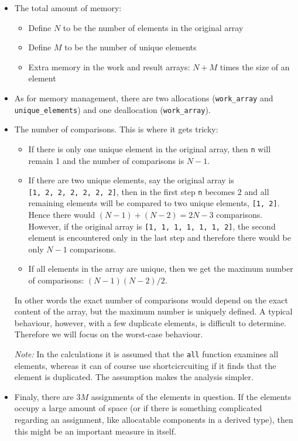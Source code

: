 \documentclass[onecolumn]{article}
\begin{document}
\begin{itemize}
\item
The total amount of memory:
    \begin{itemize}
    \item
    Define $N$ to be the number of elements in the original array
    \item
    Define $M$ to be the number of unique elements
    \item
    Extra memory in the work and result arrays: $N+M$ times the size of an element
    \end{itemize}

\item
As for memory management, there are two allocations (\verb+work_array+ and \verb+unique_elements+)
and one deallocation (\verb+work_array+).

\item
The number of comparisons. This is where it gets tricky:
    \begin{itemize}
    \item
    If there is only one unique element in the original array, then \verb+n+ will remain 1 and the number
    of comparisons is $N-1$.
    \item
    If there are two unique elements, say the original array is \\
    \verb+[1, 2, 2, 2, 2, 2, 2]+, then in the
    first step \verb+n+ becomes 2 and all remaining elements will be compared to two unique elements, \verb+[1, 2]+.
    Hence there would $(N-1) + (N-2) = 2N-3$ comparisons.
    However, if the original array is \verb+[1, 1, 1, 1, 1, 1, 2]+, the second element is encountered
    only in the last step and therefore there would be only $N-1$ comparisons.
    \item
    If all elements in the array are unique, then we get the maximum number of comparisons: $(N-1)(N-2)/2$.
    \end{itemize}
In other words the exact number of comparisons would depend on the exact content of the array, but
the maximum number is uniquely defined. A typical behaviour, however, with a few duplicate elements,
is difficult to determine. Therefore we will focus on the worst-case behaviour.

\emph{Note:} In the calculations it is assumed that the \verb+all+ function examines all elements, whereas
it can of course use shortcicrcuiting if it finds that the element is duplicated. The assumption makes
the analysis simpler.

\item
Finaly, there are $3 M$ assignments of the elements in question. If the elements occupy a large amount
of space (or if there is something complicated regarding an assignment, like allocatable components
in a derived type), then this might be an important measure in itself.
\end{itemize}
\end{document}
